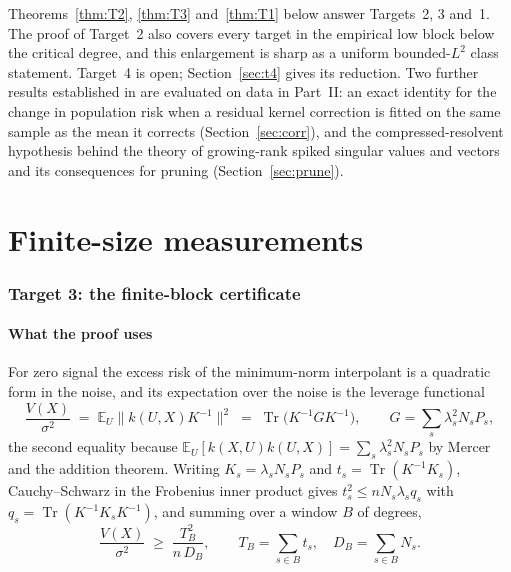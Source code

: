\documentclass[11pt]{article}
\theoremstyle{definition}
\DeclareMathOperator{\Tr}{Tr}
\newcommand{\E}{\mathbb{E}}
\begin{document}
Theorems~\ref{thm:T2}, \ref{thm:T3} and~\ref{thm:T1} below answer Targets~2, 3 and~1. The proof of
Target~2 also covers every target in the empirical low block below the critical degree, and this
enlargement is sharp as a uniform bounded-$L^2$ class statement. Target~4 is open; Section~\ref{sec:t4}
gives its reduction. Two further results established in \cite{PN24} are evaluated on data in
Part~II: an exact identity for the change in population risk when a residual kernel correction is
fitted on the same sample as the mean it corrects (Section~\ref{sec:corr}), and the
compressed-resolvent hypothesis behind the theory of growing-rank spiked singular values and vectors
\cite{BGN,BBP} and its consequences for pruning (Section~\ref{sec:prune}).







\part{Finite-size measurements}

\section{Target 3: the finite-block certificate}\label{sec:t3}

\subsection{What the proof uses}

For zero signal the excess risk of the minimum-norm interpolant is a quadratic form in the noise, and
its expectation over the noise is the leverage functional
\begin{equation}
\frac{V(X)}{\sigma^2} \;=\; \E_U\big\|k(U,X)K^{-1}\big\|^2
\;=\; \Tr\!\big(K^{-1}GK^{-1}\big),
\qquad G=\sum_s \lambda_s^2N_sP_s,
\label{eq:V}
\end{equation}
the second equality because $\E_U[k(X,U)k(U,X)]=\sum_s\lambda_s^2 N_sP_s$ by Mercer and the addition
theorem. Writing $K_s=\lambda_sN_sP_s$ and $t_s=\Tr(K^{-1}K_s)$, Cauchy--Schwarz in the Frobenius
inner product gives $t_s^2\le nN_s\lambda_sq_s$ with $q_s=\Tr(K^{-1}K_sK^{-1})$, and summing over a
window $B$ of degrees,
\begin{equation}
\frac{V(X)}{\sigma^2}\;\ge\;\frac{T_B^2}{n\,D_B},
\qquad T_B=\sum_{s\in B}t_s,\quad D_B=\sum_{s\in B}N_s .
\label{eq:window}
\end{equation}
\end{document}
